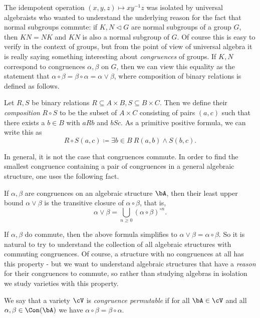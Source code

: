 The idempotent operation $(x,y,z) \mapsto xy^{-1}z$ was isolated by universal algebraists who wanted to understand the underlying reason for the fact that normal subgroups commute: if $K,N\lhd G$ are normal subgroups of a group $G$, then $KN = NK$ and $KN$ is also a normal subgroup of $G$. Of course this is easy to verify in the context of groups, but from the point of view of universal algebra it is really saying something interesting about \emph{congruences} of groups. If $K,N$ correspond to congruences $\alpha, \beta$ on $G$, then we can view this equality as the statement that $\alpha \circ \beta = \beta \circ \alpha = \alpha\vee\beta$, where composition of binary relations is defined as follows.

\begin{defn} Let $R,S$ be binary relations $R \subseteq A\times B, S\subseteq B\times C$. Then we define their \emph{composition} $R\circ S$ to be the subset of $A\times C$ consisting of pairs $(a,c)$ such that there exists a $b \in B$ with $aRb$ and $bSc$. As a primitive positive formula, we can write this as
\[
R\circ S(a,c) \coloneqq \exists b\in B\ R(a,b) \wedge S(b,c).
\]
\end{defn}

In general, it is not the case that congruences commute. In order to find the smallest congruence containing a pair of congruences in a general algebraic structure, one uses the following fact.

\begin{prop} If $\alpha,\beta$ are congruences on an algebraic structure $\bA$, then their least upper bound $\alpha \vee \beta$ is the transitive closure of $\alpha \circ \beta$, that is,
\[
\alpha \vee \beta = \bigcup_{n \ge 0} (\alpha \circ \beta)^{\circ n}.
\]
\end{prop}

If $\alpha,\beta$ do commute, then the above formula simplifies to $\alpha \vee \beta = \alpha \circ \beta$. So it is natural to try to understand the collection of all algebraic structures with commuting congruences. Of course, a structure with no congruences at all has this property - but we want to understand algebraic structures that have a \emph{reason} for their congruences to commute, so rather than studying algebras in isolation we study varieties with this property.

\begin{defn} We say that a variety $\cV$ is \emph{congruence permutable} if for all $\bA \in \cV$ and all $\alpha, \beta \in \Con(\bA)$ we have $\alpha \circ \beta = \beta \circ \alpha$.
\end{defn}

